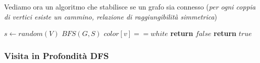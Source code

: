 \documentclass[a4paper,12pt, oneside]{book}
\begin{document}
Vediamo ora un algoritmo che stabilisce se un grafo sia connesso
(\textit{per ogni coppia di vertici esiste un cammino, relazione di
  raggiungibilità simmetrica})
\begin{shaded}
  \begin{algorithmic}
    \State $s\gets random(V)$
    \State $BFS(G, S)$
    \If $color[v]==white$
    \State \textbf{return }$false$
    \Else
    \State \textbf{return }$true$
    \EndFor
    \EndFunction
  \end{algorithmic}
\end{shaded}
\subsubsection{Visita in Profondità DFS}
\end{document}
